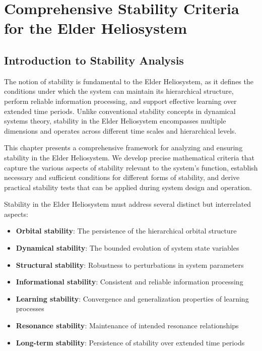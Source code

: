 \chapter{Comprehensive Stability Criteria for the Elder Heliosystem}

\section{Introduction to Stability Analysis}

The notion of stability is fundamental to the Elder Heliosystem, as it defines the conditions under which the system can maintain its hierarchical structure, perform reliable information processing, and support effective learning over extended time periods. Unlike conventional stability concepts in dynamical systems theory, stability in the Elder Heliosystem encompasses multiple dimensions and operates across different time scales and hierarchical levels.

This chapter presents a comprehensive framework for analyzing and ensuring stability in the Elder Heliosystem. We develop precise mathematical criteria that capture the various aspects of stability relevant to the system's function, establish necessary and sufficient conditions for different forms of stability, and derive practical stability tests that can be applied during system design and operation.

Stability in the Elder Heliosystem must address several distinct but interrelated aspects:
\begin{itemize}
    \item \textbf{Orbital stability}: The persistence of the hierarchical orbital structure
    \item \textbf{Dynamical stability}: The bounded evolution of system state variables
    \item \textbf{Structural stability}: Robustness to perturbations in system parameters
    \item \textbf{Informational stability}: Consistent and reliable information processing
    \item \textbf{Learning stability}: Convergence and generalization properties of learning processes
    \item \textbf{Resonance stability}: Maintenance of intended resonance relationships
    \item \textbf{Long-term stability}: Persistence of stability over extended time periods
\end{itemize}

